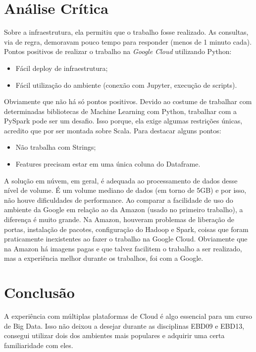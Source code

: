 \documentclass{article}
\begin{document}
\newpage
\section{Análise Crítica}
\label{sect:critic_anal}

Sobre a infraestrutura, ela permitiu que o trabalho fosse realizado. As consultas, via de regra, demoravam pouco tempo para responder (menos de 1 minuto cada). Pontos positivos de realizar o trabalho na \emph{Google Cloud} utilizando Python:

\begin{itemize}
    \item Fácil deploy de infraestrutura;
    \item Fácil utilização do ambiente (conexão com Jupyter, execução de scripts).
\end{itemize}

Obviamente que não há só pontos positivos. Devido ao costume de trabalhar com determinadas bibliotecas de Machine Learning com Python, trabalhar com a PySpark pode ser um desafio. Isso porque, ela exige algumas restrições únicas, acredito que por ser montada sobre Scala. Para destacar alguns pontos:

\begin{itemize}
    \item Não trabalha com Strings;
    \item Features precisam estar em uma única coluna do Dataframe.
\end{itemize}

A solução em núvem, em geral, é adequada ao processamento de dados desse nível de volume. É um volume mediano de dados (em torno de 5GB) e por isso, não houve dificuldades de performance. Ao comparar a facilidade de uso do ambiente da Google em relação ao da Amazon (usado no primeiro trabalho), a diferença é muito grande. Na Amazon, houveram problemas de liberação de portas, instalação de pacotes, configuração do Hadoop e Spark, coisas que foram praticamente inexistentes ao fazer o trabalho na Google Cloud. Obviamente que na Amazon há imagens pagas e que talvez facilitem o trabalho a ser realizado, mas a experiência melhor durante os trabalhos, foi com a Google.

\newpage
\section{Conclusão}
\label{sect:end}

A experiência com múltiplas plataformas de Cloud é algo essencial para um curso de Big Data. Isso não deixou a desejar durante as disciplinas EBD09 e EBD13, consegui utilizar dois dos ambientes mais populares e adquirir uma certa familiaridade com eles. 
\end{document}
